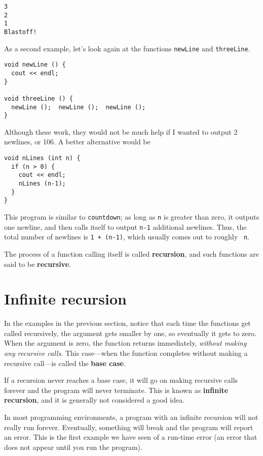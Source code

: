 \begin{verbatim}
3
2
1
Blastoff!
\end{verbatim}
%
As a second example, let's look again at the functions
{\tt newLine} and {\tt threeLine}.

\begin{lstlisting}
void newLine () {
  cout << endl;
}

void threeLine () {
  newLine ();  newLine ();  newLine ();
}
\end{lstlisting}
%
Although these work, they would not be much help if I wanted
to output 2 newlines, or 106.  A better alternative would be

\begin{lstlisting}
void nLines (int n) {
  if (n > 0) {
    cout << endl;
    nLines (n-1);
  }
}
\end{lstlisting}
%
This program is similar to {\tt countdown}; as long as {\tt n} is
greater than zero, it outputs one newline, and then calls itself to
output {\tt n-1} additional newlines.  Thus, the total number of
newlines is {\tt 1 + (n-1)}, which usually comes out to roughly {\tt
n}.


The process of a function calling itself is called {\bf recursion}, and
such functions are said to be {\bf recursive}.

\section {Infinite recursion}

In the examples in the previous section, notice that each time the
functions get called recursively, the argument gets smaller by one, so
eventually it gets to zero.  When the argument is zero, the function
returns immediately, {\em without making any recursive calls}.
This case---when the function completes without making a recursive
call---is called the {\bf base case}.

If a recursion never reaches a base case, it will go on making recursive
calls forever and the program will never terminate.  This is known as
{\bf infinite recursion}, and it is generally not considered a good
idea.


In most programming environments, a program with an infinite
recursion will not really run forever.  Eventually, something
will break and the program will report an error.  This is the
first example we have seen of a run-time error (an error that
does not appear until you run the program).

